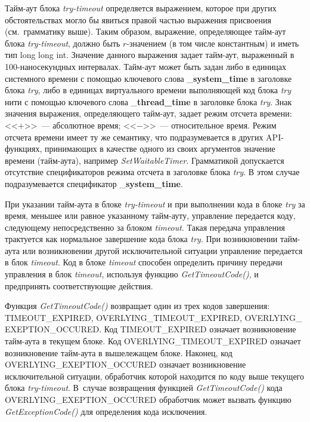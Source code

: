 \begin{multicols}{2}
Тайм-аут блока \textit{try-timeout} определяется выражением, которое при других обстоятельствах
могло бы явиться правой частью выражения присвоения (см.\ грамматику выше). Таким образом,
выражение, определяющее тайм-аут блока \textit{try-timeout}, должно быть $r$-значением (в том числе
константным) и иметь тип long long int. Значение данного выражения задает тайм-аут,
выраженный в 100-наносекундных интервалах. Тайм-аут может быть задан либо в единицах
системного времени с помощью ключевого слова \_\textbf{system\_time} в заголовке блока \textit{try}, либо в
единицах виртуального времени выполняющей код блока \textit{try} нити с помощью ключевого слова
\_\textbf{thread\_time} в заголовке блока \textit{try}. Знак значения выражения, определяющего тайм-аут, задает
режим отсчета времени: <<$+$>>~--- абсолютное время; <<$-$>>~--- относительное время. Режим
отсчета времени имеет ту же семантику, что подразумевается в других API-функциях,
принимающих в качестве одного из своих аргументов значение времени (тайм-аута), например
\textit{SetWaitableTimer}. Грамматикой допускается отсутствие спецификаторов режима отсчета в
заголовке блока \textit{try}. В этом случае подразумевается спецификатор \_\textbf{system\_time}.

При указании тайм-аута в блоке \textit{try-timeout} и при выполнении кода в блоке \textit{try} за время,
меньшее или равное указанному тайм-ауту, управление передается коду, следующему
непосредственно за блоком \textit{timeout}. Такая передача управления трактуется как нормальное
завершение кода блока \textit{try}. При возникновении тайм-аута или возникновении другой
исключительной ситуации управление передается в блок \textit{timeout}. Код в блоке \textit{timeout} способен
определить причину передачи управления в блок \textit{timeout}, используя функцию
\textit{GetTimeoutCode()}, и предпринять соответствующие действия.

     Функция \textit{GetTimeoutCode()} возвращает один из трех кодов завершения:
TIMEOUT\_EXPIRED, OVERLYING\_TIMEOUT\_EXPIRED,
OVERLYING\_ EXEPTION\_OCCURED. Код TIMEOUT\_EXPIRED означает возникновение
     тайм-аута в текущем блоке. Код OVERLYING\_TIMEOUT\_EXPIRED означает
возникновение тайм-аута в вышележащем блоке. Наконец, код
OVERLYING\_\linebreak EXEPTION\_OCCURED означает возникновение исключительной ситуации,
обработчик которой находится по коду выше текущего блока \textit{try-timeout}. В~случае возвращения
функцией \textit{GetTimeoutCode()} кода OVERLYING\_EXEPTION\_OCCURED обработчик
может вызвать функцию \textit{GetExceptionCode()} для определения кода исключения.


\end{multicols}

